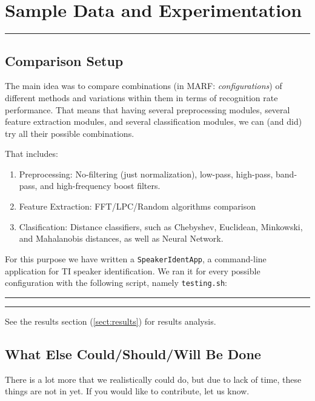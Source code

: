 \section{Sample Data and Experimentation}
\noindent
\rule{7.0in}{.013in}



\subsection{Comparison Setup}

The main idea was to compare combinations (in MARF: {\it configurations})
of different methods and variations within them in terms of recognition
rate performance. That means that having several preprocessing modules, several feature
extraction modules, and several classification modules, we can (and did)
try all their possible combinations.

That includes:

\begin{enumerate}
	\item Preprocessing: No-filtering (just normalization), low-pass, high-pass,
	      band-pass, and high-frequency boost filters.
	\item Feature Extraction: FFT/LPC/Random algorithms comparison
	\item Clasification: Distance classifiers, such as Chebyshev, Euclidean,
	      Minkowski, and Mahalanobis distances, as well as Neural Network.
\end{enumerate}


For this purpose we have written a \verb+SpeakerIdentApp+, a command-line application
for TI speaker identification. We ran it for every possible configuration
with the following script, namely \verb+testing.sh+:

\vspace{15pt}
\hrule
{\scriptsize }
\hrule
\vspace{15pt}

See the results section (\ref{sect:results}) for results analysis.

\subsection{What Else Could/Should/Will Be Done}

There is a lot more that we realistically could do, but due to lack of time, these things
are not in yet. If you would like to contribute, let us know.

